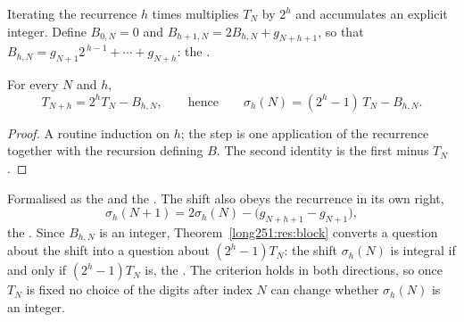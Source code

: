 Iterating the recurrence $h$ times multiplies $T_N$ by $2^{h}$ and accumulates
an explicit integer.  Define $B_{0,N}=0$ and $B_{h+1,N}=2B_{h,N}+g_{N+h+1}$,
so that $B_{h,N}=g_{N+1}2^{\,h-1}+\cdots+g_{N+h}$: the
.

\begin{theorem}\label{long251:res:block}
For every $N$ and $h$,
\[
 T_{N+h}=2^{h}T_N-B_{h,N},
 \qquad\text{hence}\qquad
 \sigma_h(N)=(2^{h}-1)\,T_N-B_{h,N} .
\]
\end{theorem}

\begin{proof}
A routine induction on $h$; the step is one application of the recurrence
together with the recursion defining $B$.  The second identity is the first
minus $T_N$.
\end{proof}

\noindent Formalised as the
 and the
.  The shift also obeys the recurrence in its own right,
\begin{equation}\label{long251:eq:shift-step}
 \sigma_h(N+1)=2\sigma_h(N)-\bigl(g_{N+h+1}-g_{N+1}\bigr),
\end{equation}
the
.  Since $B_{h,N}$ is an integer, Theorem~\ref{long251:res:block} converts a
question about the shift into a question about $(2^{h}-1)T_N$: the shift
$\sigma_h(N)$ is integral if and only if $(2^{h}-1)T_N$ is, the
.  The criterion holds in both directions, so once
$T_N$ is fixed no choice of the digits after index $N$ can change whether
$\sigma_h(N)$ is an integer.

